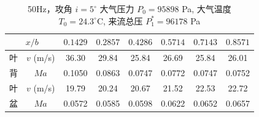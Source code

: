 \begin{table}[H]
  \centering
  \caption[50Hz 攻角 $i=5^\circ$ v/Ma 数据]{50Hz，攻角 $i=5^\circ$ 大气压力 $P_0=95898$ Pa, 大气温度 $T_0=24.3^\circ\text{C}$, 来流总压 $P_1^*=96178$ Pa}
  \label{tab:exp4_vma_50Hz_5}
  \renewcommand{\arraystretch}{1.2}
  \begin{tabular}{cccccccc}
    \toprule
    \multicolumn{2}{c}{$x/b$} & $0.1429$ & $0.2857$ & $0.4286$ & $0.5714$ & $0.7143$ & $0.8571$ \\
    \midrule
    叶 & $v$ (m/s) & 36.30 & 29.84 & 25.84 & 26.69 & 25.84 & 26.01 \\
    背 & $Ma$ & 0.1050 & 0.0863 & 0.0747 & 0.0772 & 0.0747 & 0.0752 \\
    \midrule
    叶 & $v$ (m/s) & 19.79 & 20.24 & 20.67 & 21.52 & 22.53 & 22.72 \\
    盆 & $Ma$ & 0.0572 & 0.0585 & 0.0598 & 0.0622 & 0.0652 & 0.0657 \\
    \bottomrule
  \end{tabular}
\end{table}